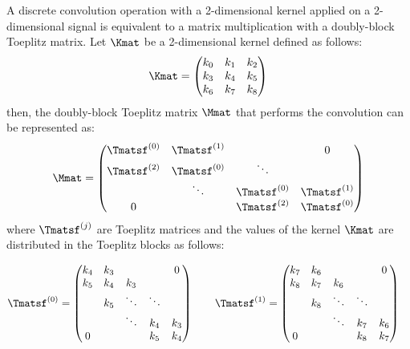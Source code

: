 
A discrete convolution operation with a 2-dimensional kernel applied on a 2-dimensional signal is equivalent to a matrix multiplication with a doubly-block Toeplitz matrix.
Let $\Kmat$ be a 2-dimensional kernel defined as follows:
\begin{equation*}
  \Kmat = \leftmatrix
    k_0 & k_1 & k_2 \\
    k_3 & k_4 & k_5 \\
    k_6 & k_7 & k_8 
  \rightmatrix
\end{equation*}
then, the doubly-block Toeplitz matrix $\Mmat$ that performs the convolution can be represented as:
\begin{equation*}
  \Mmat = \leftmatrix
    \Tmatsf^{(0)} & \Tmatsf^{(1)} &             &  0          \\
    \Tmatsf^{(2)} & \Tmatsf^{(0)} & \ddots      &             \\
                  & \ddots        & \Tmatsf^{(0)} & \Tmatsf^{(1)} \\
    0             &               & \Tmatsf^{(2)} & \Tmatsf^{(0)}
  \rightmatrix
\end{equation*}
where $\Tmatsf^{(j)}$ are Toeplitz matrices and the values of the kernel $\Kmat$ are distributed in the Toeplitz blocks as follows:

\begin{equation*}
  \Tmatsf^{(0)} = \leftmatrix
    k_4 & k_3 &         &         & 0       \\
    k_5 & k_4 & k_3 &         &         \\
            & k_5 & \ddots  & \ddots  &         \\
            &         & \ddots  & k_4 & k_3 \\
    0       &         &         & k_5 & k_4
  \rightmatrix \quad \quad
  \hfill
  \Tmatsf^{(1)} = \leftmatrix
    k_7 & k_6 &         &         & 0       \\
    k_8 & k_7 & k_6 &         &         \\
            & k_8 & \ddots  & \ddots  &         \\
            &         & \ddots  & k_7 & k_6 \\
    0       &         &         & k_8 & k_7 \\
  \rightmatrix \quad
\end{equation*}

